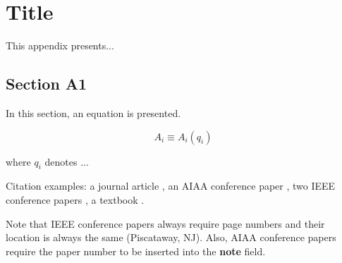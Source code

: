 \chapter{Title}\label{APPA}

This appendix presents...

\section{Section A1}\label{APPA_A1}

In this section, an equation is presented.

\begin{equation}
A_i\equiv A_i(q_i)
\label{eqA_2_1}
\end{equation}

\noindent where $q_i$ denotes ...

Citation examples: a journal article \cite{CW}, an AIAA conference paper \cite{AIAA_conf_example}, two IEEE conference papers \cite{IEEE_conf_example1,IEEE_conf_example2}, a textbook \cite{Fehse}. 

\noindent Note that IEEE conference papers always require page numbers and their location is always the same (Piscataway, NJ). Also, AIAA conference papers require the paper number to be inserted into the \textbf{note} field.
